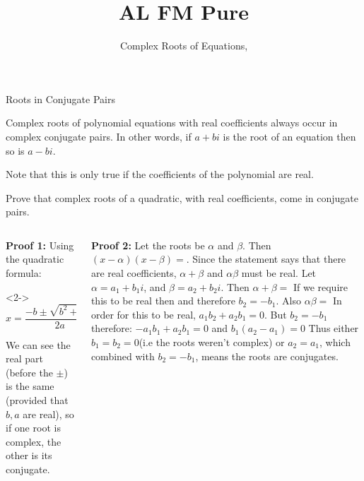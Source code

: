 \documentclass[8pt]{beamer}
\title[Pure]{{\color{aa}\Huge\adfbullet{9}}AL FM Pure}
\subtitle{Complex Roots of Equations, \textattachfile{ComplexRootsofEquations.tex}{(TeX)}}
\begin{document}
\setlength{\abovedisplayskip}{0pt}
\setlength{\belowdisplayskip}{0pt}
\setlength{\abovedisplayshortskip}{0pt}
\setlength{\belowdisplayshortskip}{0pt}


\frame{\titlepage}

\begin{frame}[shrink=10]{Roots in Conjugate Pairs}
	\begin{definition}
		Complex roots of polynomial equations with real coefficients always occur in complex conjugate pairs.
In other words, if $a+bi$ is the root of an equation then so is $a-bi$.
	\end{definition}

	\alert{Note that this is only true if the coefficients of the polynomial are real.}

	\begin{problem}
		Prove that complex roots of a quadratic, with real coefficients, come in conjugate pairs.
	\end{problem}

	\begin{columns}[T]
	\begin{column}{.5\linewidth}
		\textbf{Proof 1:}
Using the quadratic formula:
		\begin{solution}<2->
			\[
			x=\frac{-b \pm \sqrt{b^2+4ac} }{2a}.
			.\] 

			We can see the real part (before the $\pm$) is the same (provided that  $b,a$ are real), so if one root is complex, the other is its conjugate.
		\end{solution}
	\end{column}
	\begin{column}{.5\linewidth}
	\textbf{Proof 2:}
Let the roots be $\alpha$ and $\beta$.
	Then $(x-\alpha)(x-\beta)=$.
	Since the statement says that there are real coefficients, $\alpha + \beta$ and  $\alpha \beta$ must be real.
	Let  $\alpha=a_1+b_1 i$, and $\beta=a_2 + b_2 i$.
	Then $\alpha +\beta=$
	If we require this to be real then  and therefore $b_2=-b_1$.
	Also $\alpha \beta= $
	In order for this to be real, $ a_1b_2+a_2b_1=0.$
	But $b_2=-b_1$ therefore: 
	$-a_1b_1+a_2b_1=0$ and $b_1(a_2-a_1)=0$
	Thus either $b_1=b_2=0$(i.e the roots weren't complex) or $ a_2=a_1$, which combined with $b_2=-b_1$, means the roots are conjugates.

	\end{column}
	\end{columns}
\end{frame}
\end{document}
